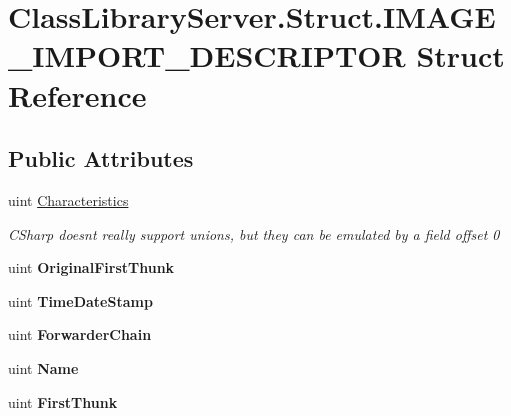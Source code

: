 \hypertarget{struct_class_library_server_1_1_struct_1_1_i_m_a_g_e___i_m_p_o_r_t___d_e_s_c_r_i_p_t_o_r}{}\section{Class\+Library\+Server.\+Struct.\+I\+M\+A\+G\+E\+\_\+\+I\+M\+P\+O\+R\+T\+\_\+\+D\+E\+S\+C\+R\+I\+P\+T\+OR Struct Reference}
\label{struct_class_library_server_1_1_struct_1_1_i_m_a_g_e___i_m_p_o_r_t___d_e_s_c_r_i_p_t_o_r}
\subsection*{Public Attributes}
\begin{DoxyCompactItemize}
\item 
uint \mbox{\hyperlink{struct_class_library_server_1_1_struct_1_1_i_m_a_g_e___i_m_p_o_r_t___d_e_s_c_r_i_p_t_o_r_a58deeb6b3dc021c27efff07331a86a02}{Characteristics}}
\begin{DoxyCompactList}\small\item\em C\+Sharp doesnt really support unions, but they can be emulated by a field offset 0 \end{DoxyCompactList}\item 
\mbox{\label{struct_class_library_server_1_1_struct_1_1_i_m_a_g_e___i_m_p_o_r_t___d_e_s_c_r_i_p_t_o_r_aafd85f58651e3059090154b8bb2b4932}} 
uint {\bfseries Original\+First\+Thunk}
\item 
\mbox{\label{struct_class_library_server_1_1_struct_1_1_i_m_a_g_e___i_m_p_o_r_t___d_e_s_c_r_i_p_t_o_r_aa2bc31a51495b2aabd2cd83fe9f10f80}} 
uint {\bfseries Time\+Date\+Stamp}
\item 
\mbox{\label{struct_class_library_server_1_1_struct_1_1_i_m_a_g_e___i_m_p_o_r_t___d_e_s_c_r_i_p_t_o_r_ad49db6e161636ca41c59bfcee8941eee}} 
uint {\bfseries Forwarder\+Chain}
\item 
\mbox{\label{struct_class_library_server_1_1_struct_1_1_i_m_a_g_e___i_m_p_o_r_t___d_e_s_c_r_i_p_t_o_r_a6d3600e681eec97da05bd9c151930d17}} 
uint {\bfseries Name}
\item 
\mbox{\label{struct_class_library_server_1_1_struct_1_1_i_m_a_g_e___i_m_p_o_r_t___d_e_s_c_r_i_p_t_o_r_ad0f1cd45e9de9e93af04223354b28c2b}} 
uint {\bfseries First\+Thunk}
\end{DoxyCompactItemize}


